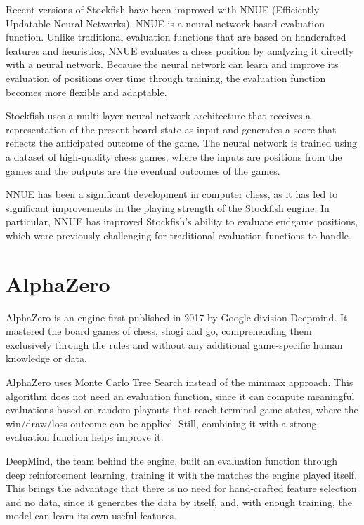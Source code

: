 Recent versions of Stockfish have been improved with NNUE (Efficiently Updatable Neural Networks). NNUE is a neural network-based evaluation function. Unlike traditional evaluation functions that are based on handcrafted features and heuristics, NNUE evaluates a chess position by analyzing it directly with a neural network. Because the neural network can learn and improve its evaluation of positions over time through training, the evaluation function becomes more flexible and adaptable.

Stockfish uses a multi-layer neural network architecture that receives a representation of the present board state as input and generates a score that reflects the anticipated outcome of the game. The neural network is trained using a dataset of high-quality chess games, where the inputs are positions from the games and the outputs are the eventual outcomes of the games.

NNUE has been a significant development in computer chess, as it has led to significant improvements in the playing strength of the Stockfish engine. In particular, NNUE has improved Stockfish's ability to evaluate endgame positions, which were previously challenging for traditional evaluation functions to handle.

\section{AlphaZero}
\label{sec:ch3sec4}

AlphaZero is an engine first published in 2017 by Google division Deepmind. It mastered the board games of chess, shogi and go, comprehending them exclusively through the rules and without any additional game-specific human knowledge or data.

AlphaZero uses Monte Carlo Tree Search instead of the minimax approach. This algorithm does not need an evaluation function, since it can compute meaningful evaluations based on random playouts that reach terminal game states, where the win/draw/loss outcome can be applied. Still, combining it with a strong evaluation function helps improve it.

DeepMind, the team behind the engine, built an evaluation function through deep reinforcement learning, training it with the matches the engine played itself. This brings the advantage that there is no need for hand-crafted feature selection and no data, since it generates the data by itself, and, with enough training, the model can learn its own useful features.

